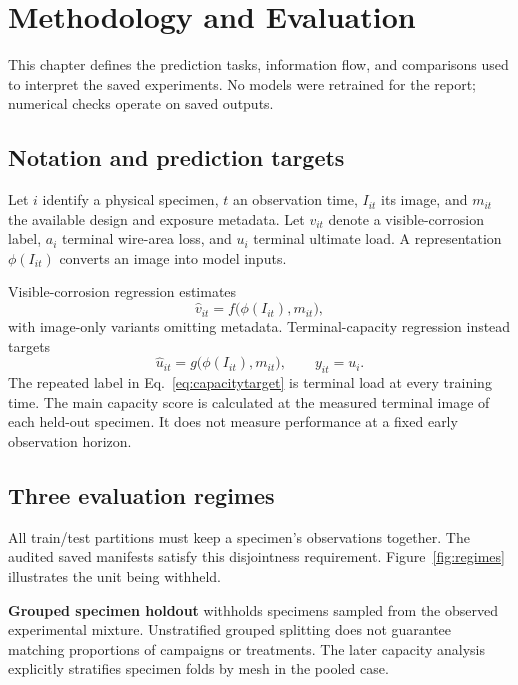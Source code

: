 \chapter{Methodology and Evaluation}\label{ch:methods}
This chapter defines the prediction tasks, information flow, and comparisons used to interpret the saved experiments. No models were retrained for the report; numerical checks operate on saved outputs.

\section{Notation and prediction targets}
Let $i$ identify a physical specimen, $t$ an observation time, $I_{it}$ its image, and $m_{it}$ the available design and exposure metadata. Let $v_{it}$ denote a visible-corrosion label, $a_i$ terminal wire-area loss, and $u_i$ terminal ultimate load. A representation $\phi(I_{it})$ converts an image into model inputs.

Visible-corrosion regression estimates
\begin{equation}\widehat v_{it}=f\bigl(\phi(I_{it}),m_{it}\bigr),\end{equation}
with image-only variants omitting metadata. Terminal-capacity regression instead targets
\begin{equation}\widehat u_{it}=g\bigl(\phi(I_{it}),m_{it}\bigr),\qquad y_{it}=u_i.\label{eq:capacitytarget}\end{equation}
The repeated label in Eq.~\eqref{eq:capacitytarget} is terminal load at every training time. The main capacity score is calculated at the measured terminal image of each held-out specimen. It does not measure performance at a fixed early observation horizon.

\section{Three evaluation regimes}\label{sec:regimes}
All train/test partitions must keep a specimen's observations together. The audited saved manifests satisfy this disjointness requirement. Figure~\ref{fig:regimes} illustrates the unit being withheld.

\textbf{Grouped specimen holdout} withholds specimens sampled from the observed experimental mixture. Unstratified grouped splitting does not guarantee matching proportions of campaigns or treatments. The later capacity analysis explicitly stratifies specimen folds by mesh in the pooled case.

